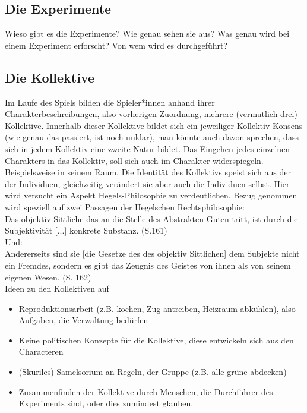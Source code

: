 \documentclass[a4paper, 12pt]{scrartcl}
\begin{document}
    \subsection{Die Experimente}
    Wieso gibt es die Experimente? 
    Wie genau sehen sie aus? 
    Was genau wird bei einem Experiment erforscht? 
    Von wem wird es durchgeführt? \\
    \subsection{Die Kollektive}
    Im Laufe des Spiels bilden die Spieler*innen anhand ihrer Charakterbeschreibungen, also vorherigen Zuordnung, mehrere (vermutlich drei) Kollektive. 
    Innerhalb dieser Kollektive bildet sich ein jeweiliger Kollektiv-Konsens (wie genau das passiert, ist noch unklar), man könnte auch davon sprechen, dass sich in jedem Kollektiv eine \hyperref[zweite-natur]{\glqq zweite Natur\grqq{}} bildet. 
    Das Eingehen jedes einzelnen Charakters in das Kollektiv, soll sich auch im Charakter widerspiegeln. Beispielsweise in seinem Raum. Die Identität des Kollektivs speist sich aus der der Individuen, gleichzeitig verändert sie aber auch die Individuen selbst. 
    Hier wird versucht ein Aspekt Hegels-Philosophie zu verdeutlichen. Bezug genommen wird speziell auf zwei Passagen der Hegelschen Rechtsphilosophie: \\
    \glqq Das objektiv Sittliche das an die Stelle des Abstrakten Guten tritt, ist durch die Subjektivität [...] konkrete Substanz.\grqq{} (S.161)\cite{hegel:rph} \\
    Und:\\
    \glqq Andererseits sind sie [die Gesetze des des objektiv Sittlichen] dem Subjekte nicht ein Fremdes, sondern es gibt das Zeugnis des Geistes von ihnen als von seinem eigenen Wesen.\grqq{} (S. 162)\cite{hegel:rph} \\
    Ideen zu den Kollektiven auf
    \begin{itemize}
    \item Reproduktionsarbeit (z.B. kochen, Zug antreiben, Heizraum abkühlen), also Aufgaben, die Verwaltung bedürfen
    \item Keine politischen Konzepte für die Kollektive, diese entwickeln sich aus den Characteren
    \item (Skuriles) Samelsorium an Regeln, der Gruppe (z.B. alle grüne abdecken)
    \item Zusammenfinden der Kollektive durch Menschen, die Durchführer des Experiments sind, oder dies zumindest glauben.
    \end{itemize}
    
\end{document}
